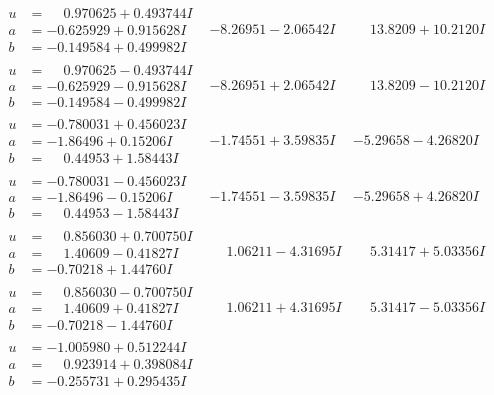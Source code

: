 \documentclass[1p]{elsarticle_modified}
\theoremstyle{definition}
\begin{document}
$$\begin{array}{c|c|c}
\begin{aligned}
u &= \phantom{-}0.970625 + 0.493744 I \\
a &= -0.625929 + 0.915628 I \\
b &= -0.149584 + 0.499982 I\end{aligned}
 & -8.26951 - 2.06542 I & \phantom{-}13.8209 + 10.2120 I \\ \hline\begin{aligned}
u &= \phantom{-}0.970625 - 0.493744 I \\
a &= -0.625929 - 0.915628 I \\
b &= -0.149584 - 0.499982 I\end{aligned}
 & -8.26951 + 2.06542 I & \phantom{-}13.8209 - 10.2120 I \\ \hline\begin{aligned}
u &= -0.780031 + 0.456023 I \\
a &= -1.86496 + 0.15206 I \\
b &= \phantom{-}0.44953 + 1.58443 I\end{aligned}
 & -1.74551 + 3.59835 I & -5.29658 - 4.26820 I \\ \hline\begin{aligned}
u &= -0.780031 - 0.456023 I \\
a &= -1.86496 - 0.15206 I \\
b &= \phantom{-}0.44953 - 1.58443 I\end{aligned}
 & -1.74551 - 3.59835 I & -5.29658 + 4.26820 I \\ \hline\begin{aligned}
u &= \phantom{-}0.856030 + 0.700750 I \\
a &= \phantom{-}1.40609 - 0.41827 I \\
b &= -0.70218 + 1.44760 I\end{aligned}
 & \phantom{-}1.06211 - 4.31695 I & \phantom{-}5.31417 + 5.03356 I \\ \hline\begin{aligned}
u &= \phantom{-}0.856030 - 0.700750 I \\
a &= \phantom{-}1.40609 + 0.41827 I \\
b &= -0.70218 - 1.44760 I\end{aligned}
 & \phantom{-}1.06211 + 4.31695 I & \phantom{-}5.31417 - 5.03356 I \\ \hline\begin{aligned}
u &= -1.005980 + 0.512244 I \\
a &= \phantom{-}0.923914 + 0.398084 I \\
b &= -0.255731 + 0.295435 I\end{aligned}

\end{array}$$
\end{document}
